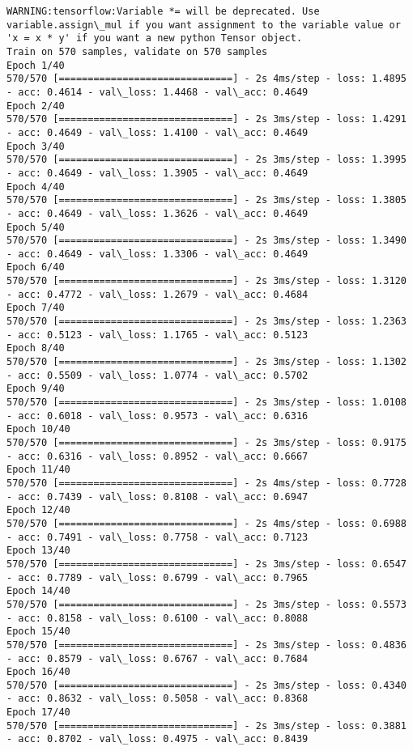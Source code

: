 \documentclass[11pt]{article}
\begin{document}
    \begin{Verbatim}[commandchars=\\\{\}]
WARNING:tensorflow:Variable *= will be deprecated. Use variable.assign\_mul if you want assignment to the variable value or 'x = x * y' if you want a new python Tensor object.
Train on 570 samples, validate on 570 samples
Epoch 1/40
570/570 [==============================] - 2s 4ms/step - loss: 1.4895 - acc: 0.4614 - val\_loss: 1.4468 - val\_acc: 0.4649
Epoch 2/40
570/570 [==============================] - 2s 3ms/step - loss: 1.4291 - acc: 0.4649 - val\_loss: 1.4100 - val\_acc: 0.4649
Epoch 3/40
570/570 [==============================] - 2s 3ms/step - loss: 1.3995 - acc: 0.4649 - val\_loss: 1.3905 - val\_acc: 0.4649
Epoch 4/40
570/570 [==============================] - 2s 3ms/step - loss: 1.3805 - acc: 0.4649 - val\_loss: 1.3626 - val\_acc: 0.4649
Epoch 5/40
570/570 [==============================] - 2s 3ms/step - loss: 1.3490 - acc: 0.4649 - val\_loss: 1.3306 - val\_acc: 0.4649
Epoch 6/40
570/570 [==============================] - 2s 3ms/step - loss: 1.3120 - acc: 0.4772 - val\_loss: 1.2679 - val\_acc: 0.4684
Epoch 7/40
570/570 [==============================] - 2s 3ms/step - loss: 1.2363 - acc: 0.5123 - val\_loss: 1.1765 - val\_acc: 0.5123
Epoch 8/40
570/570 [==============================] - 2s 3ms/step - loss: 1.1302 - acc: 0.5509 - val\_loss: 1.0774 - val\_acc: 0.5702
Epoch 9/40
570/570 [==============================] - 2s 3ms/step - loss: 1.0108 - acc: 0.6018 - val\_loss: 0.9573 - val\_acc: 0.6316
Epoch 10/40
570/570 [==============================] - 2s 3ms/step - loss: 0.9175 - acc: 0.6316 - val\_loss: 0.8952 - val\_acc: 0.6667
Epoch 11/40
570/570 [==============================] - 2s 4ms/step - loss: 0.7728 - acc: 0.7439 - val\_loss: 0.8108 - val\_acc: 0.6947
Epoch 12/40
570/570 [==============================] - 2s 4ms/step - loss: 0.6988 - acc: 0.7491 - val\_loss: 0.7758 - val\_acc: 0.7123
Epoch 13/40
570/570 [==============================] - 2s 3ms/step - loss: 0.6547 - acc: 0.7789 - val\_loss: 0.6799 - val\_acc: 0.7965
Epoch 14/40
570/570 [==============================] - 2s 3ms/step - loss: 0.5573 - acc: 0.8158 - val\_loss: 0.6100 - val\_acc: 0.8088
Epoch 15/40
570/570 [==============================] - 2s 3ms/step - loss: 0.4836 - acc: 0.8579 - val\_loss: 0.6767 - val\_acc: 0.7684
Epoch 16/40
570/570 [==============================] - 2s 3ms/step - loss: 0.4340 - acc: 0.8632 - val\_loss: 0.5058 - val\_acc: 0.8368
Epoch 17/40
570/570 [==============================] - 2s 3ms/step - loss: 0.3881 - acc: 0.8702 - val\_loss: 0.4975 - val\_acc: 0.8439

\end{Verbatim}
\end{document}
